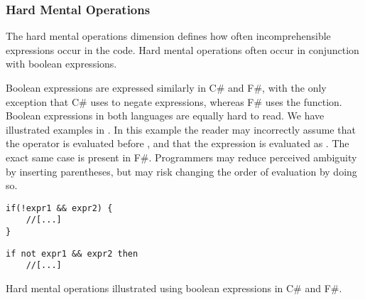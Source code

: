 \subsubsection{Hard Mental Operations}
The hard mental operations dimension defines how often incomprehensible expressions occur in the code. Hard mental operations often occur in conjunction with boolean expressions\cite{green1996usability}.

Boolean expressions are expressed similarly in C\# and F\#, with the only exception that C\# uses \ttt{!} to negate expressions, whereas F\# uses the  function. Boolean expressions in both languages are equally hard to read. We have illustrated examples in . In this example the reader may incorrectly assume that the \ttt{\&\&} operator is evaluated before \ttt{!}, and that the expression is evaluated as . The exact same case is present in F\#. Programmers may reduce perceived ambiguity by inserting parentheses, but may risk changing the order of evaluation by doing so.

\begin{listing}[H]
    \begin{minipage}{.45\textwidth}
        \begin{verbatim}
if(!expr1 && expr2) {
    //[...]
}
        \end{verbatim}
    \end{minipage}
    \hfill
    \begin{minipage}{.45\textwidth}
        \begin{verbatim}
if not expr1 && expr2 then
    //[...]
        \end{verbatim}
    \end{minipage}
\caption{Hard mental operations illustrated using boolean expressions in C\# and F\#.}
\label{lst:hard:mental:operations}
\end{listing}

